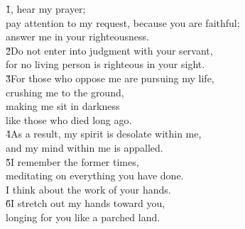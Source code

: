 \begin{poetry}
\poeml \v{1}, hear my prayer; \\
\poemll    pay attention to my request, because you are faithful; \\
\poemlll       answer me in your righteousness. \\
\poeml \v{2}Do not enter into judgment with your servant, \\
\poemll    for no living person is righteous in your sight. \\
\poeml \v{3}For those who oppose me are pursuing my life, \\
\poemll    crushing me to the ground, \\
\poeml making me sit in darkness \\
\poemll    like those who died long ago. \\
\poeml \v{4}As a result, my spirit is desolate within me, \\
\poemll    and my mind within me is appalled. \\
\poeml \v{5}I remember the former times, \\
\poemll    meditating on everything you have done. \\
\poemlll       I think about the work of your hands. \\
\poeml \v{6}I stretch out my hands toward you, \\
\poemll    longing for you like a parched land.
\end{poetry}

